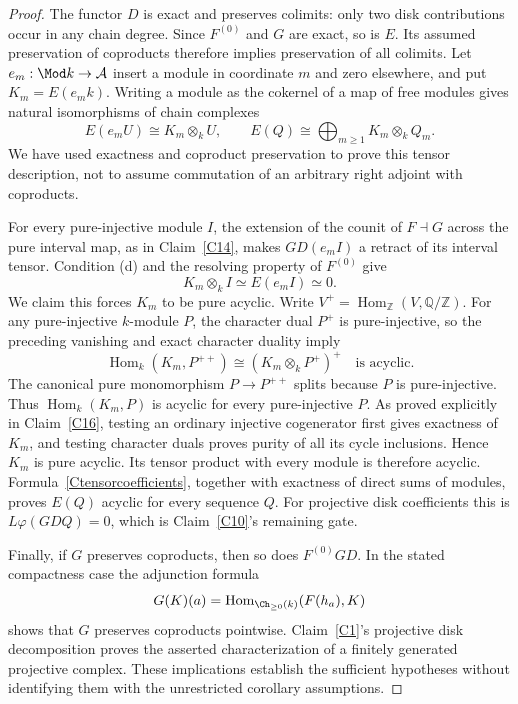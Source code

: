 \begin{proof}
The functor $D$ is exact and preserves colimits: only two disk contributions occur in any chain degree. Since $F^{(0)}$ and $G$ are exact, so is $E$. Its assumed preservation of coproducts therefore implies preservation of all colimits. Let $e_m:\Mod k\to\mathcal A$ insert a module in coordinate $m$ and zero elsewhere, and put $K_m=E(e_m k)$. Writing a module as the cokernel of a map of free modules gives natural isomorphisms of chain complexes
\[
 E(e_mU)\cong K_m\otimes_kU,
 \qquad E(Q)\cong\bigoplus_{m\geq1}K_m\otimes_kQ_m.
 \tag{C-tensor-coefficients}\label{Ctensorcoefficients}
\]
We have used exactness and coproduct preservation to prove this tensor description, not to assume commutation of an arbitrary right adjoint with coproducts.

For every pure-injective module $I$, the extension of the counit of $F\dashv G$ across the pure interval map, as in Claim~\ref{C14}, makes $GD(e_mI)$ a retract of its interval tensor. Condition (d) and the resolving property of $F^{(0)}$ give
\[
 K_m\otimes_k I\simeq E(e_mI)\simeq0.
\]
We claim this forces $K_m$ to be pure acyclic. Write $V^+=\operatorname{Hom}_{\mathbb Z}(V,\mathbb Q/\mathbb Z)$. For any pure-injective $k$-module $P$, the character dual $P^+$ is pure-injective, so the preceding vanishing and exact character duality imply
\[
 \operatorname{Hom}_k(K_m,P^{++})
 \cong (K_m\otimes_kP^+)^+
 \quad\text{is acyclic}.
\]
The canonical pure monomorphism $P\to P^{++}$ splits because $P$ is pure-injective. Thus $\operatorname{Hom}_k(K_m,P)$ is acyclic for every pure-injective $P$. As proved explicitly in Claim~\ref{C16}, testing an ordinary injective cogenerator first gives exactness of $K_m$, and testing character duals proves purity of all its cycle inclusions. Hence $K_m$ is pure acyclic. Its tensor product with every module is therefore acyclic. Formula~\eqref{Ctensorcoefficients}, together with exactness of direct sums of modules, proves $E(Q)$ acyclic for every sequence $Q$. For projective disk coefficients this is $L\varphi(GDQ)=0$, which is Claim~\ref{C10}'s remaining gate.

Finally, if $G$ preserves coproducts, then so does $F^{(0)}GD$. In the stated compactness case the adjunction formula
\[
 G(K)(a)=\operatorname{Hom}_{\Ch_{\geq0}(k)}(F(h_a),K)
\]
shows that $G$ preserves coproducts pointwise. Claim~\ref{C1}'s projective disk decomposition proves the asserted characterization of a finitely generated projective complex. These implications establish the sufficient hypotheses without identifying them with the unrestricted corollary assumptions.
\end{proof}

